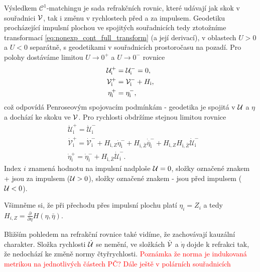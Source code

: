 Výsledkem $\mathcal{C}^1$-matchingu je sada refrakčních rovnic, které udávají jak skok v souřadnici $\mathcal{V}$,
tak i změnu v rychlostech před a za impulsem. Geodetiku procházející impulsní plochou ve spojitých souřadnicích tedy
ztotožníme transformací \eqref{eq:nonexp_cont_full_transform} (a její derivací), v oblastech $U > 0$ a $U < 0$ separátně, s geodetikami v souřadnicích prostoročasu na pozadí.
Pro polohy dostáváme limitou $U \to 0^+$ a $U \to 0^-$ rovnice
\begin{equation}
    \label{eq_refraction_nonexpanding_positions}
    \begin{split}
        \mathcal{U}^{+}_{\mathrm{i}} &= \mathcal{U}^{-}_{\mathrm{i}} = 0,\\
        \mathcal{V}^{+}_{\mathrm{i}} &= \mathcal{V}^{-}_{\mathrm{i}} + H_{\mathrm{i}},\\
        \eta^{+}_{\mathrm{i}} &= \eta^{-}_{\mathrm{i}},
    \end{split}
\end{equation}
což odpovídá Penroseovým spojovacím podmínkám - geodetika je spojitá v $\mathcal{U}$ a $\eta$ a dochází ke skoku ve $\mathcal{V}$.
Pro rychlosti obdržíme stejnou limitou rovnice
\begin{equation}
    \label{eq:refraction_nonexpanding_velocities}
    \begin{split}
        &\dot{\mathcal{U}}^{+}_{\mathrm{i}} = \dot{\mathcal{U}}^{-}_{\mathrm{i}}\\
        &\dot{\mathcal{V}}^{+}_{\mathrm{i}} = \dot{\mathcal{V}}_{\mathrm{i}}^{-} + H_{\mathrm{i}, Z}
        \dot{\eta}^{-}_{\mathrm{i}} + H_{\mathrm{i}, \bar{Z}} \dot{\overline{\eta}}^{-}_{\mathrm{i}} + 
        H_{\mathrm{i}, Z} H_{\mathrm{i}, \bar{Z}} \dot{\mathcal{U}}_{\mathrm{i}}^{-}\\
        &\dot{\eta}_{\mathrm{i}}^{+} =\dot{\eta}_{\mathrm{i}}^{-}+H_{\mathrm{i}, \bar{Z}}
        \dot{\mathcal{U}}_{\mathrm{i}}^{-}.
    \end{split}
\end{equation}
Index $i$ znamená hodnotu na impulsní nadploše $\mathcal{U} = 0$, složky označené znakem + jsou za impulsem ($\mathcal{U} > 0$),
složky označené znakem - jsou před impulsem ($\mathcal{U} <0$).

Všimněme si, že při přechodu přes impulsní plochu platí $\eta_i = Z_i$ a tedy $ H_{i,Z} = \frac{\partial}{\partial \eta} H(\eta, \bar{\eta})$.

Bližším pohledem na refrakční rovnice také vidíme, že zachovávají kauzální charakter. Složka rychlosti $\dot {\mathcal{U}}$ se
nemění, ve složkách $\dot {\mathcal{V}}$ a $\dot \eta$ dojde k refrakci tak, že nedochází ke změně normy čtyřrychlosti. \textcolor{red}{Poznámka že norma je indukovaná metrikou na jednotlivých částech PČ? Dále ještě v polárních souřadnicích}

